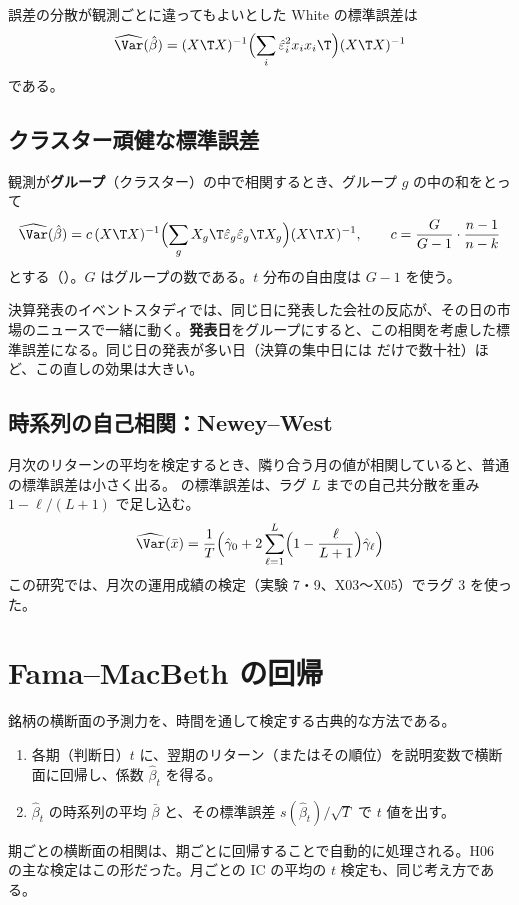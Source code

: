 誤差の分散が観測ごとに違ってもよいとした White の標準誤差は
\begin{equation}
\widehat{\Var}(\hat\beta) = (X\T X)^{-1}\Bigl(\sum_i \hat\varepsilon_i^2 x_i x_i\T\Bigr)(X\T X)^{-1}
\end{equation}
である。

\subsection{クラスター頑健な標準誤差}

観測が\textbf{グループ}（クラスター）の中で相関するとき、グループ $g$ の中の和をとって
\begin{equation}
\widehat{\Var}(\hat\beta) = c\,(X\T X)^{-1}\Bigl(\sum_g X_g\T\hat\varepsilon_g\hat\varepsilon_g\T X_g\Bigr)(X\T X)^{-1},\qquad c = \frac{G}{G-1}\cdot\frac{n-1}{n-k}
\end{equation}
とする（）。$G$ はグループの数である。$t$ 分布の自由度は $G-1$ を使う。

決算発表のイベントスタディでは、同じ日に発表した会社の反応が、その日の市場のニュースで一緒に動く。\textbf{発表日}をグループにすると、この相関を考慮した標準誤差になる。同じ日の発表が多い日（決算の集中日には \SP{} だけで数十社）ほど、この直しの効果は大きい。

\subsection{時系列の自己相関：Newey--West}

月次のリターンの平均を検定するとき、隣り合う月の値が相関していると、普通の標準誤差は小さく出る。 の標準誤差は、ラグ $L$ までの自己共分散を重み $1 - \ell/(L+1)$ で足し込む。
\begin{equation}
\widehat{\Var}(\bar x) = \frac{1}{T}\Bigl(\hat\gamma_0 + 2\sum_{\ell=1}^{L}\Bigl(1-\frac{\ell}{L+1}\Bigr)\hat\gamma_\ell\Bigr)
\end{equation}
この研究では、月次の運用成績の検定（実験 7・9、X03〜X05）でラグ 3 を使った。

\section{Fama--MacBeth の回帰}

銘柄の横断面の予測力を、時間を通して検定する古典的な方法である。

\begin{enumerate}
\item 各期（判断日）$t$ に、翌期のリターン（またはその順位）を説明変数で横断面に回帰し、係数 $\hat\beta_t$ を得る。
\item $\hat\beta_t$ の時系列の平均 $\bar\beta$ と、その標準誤差 $s(\hat\beta_t)/\sqrt{T}$ で $t$ 値を出す。
\end{enumerate}
期ごとの横断面の相関は、期ごとに回帰することで自動的に処理される。H06 の主な検定はこの形だった。月ごとの IC の平均の $t$ 検定も、同じ考え方である。

